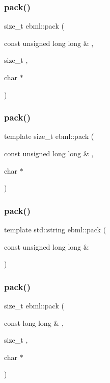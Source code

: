 \subsubsection{\texorpdfstring{pack()}{pack()}\hspace{0.1cm}{\footnotesize\ttfamily [2/18]}}
{\footnotesize\ttfamily size\+\_\+t ebml\+::pack (\begin{DoxyParamCaption}\item[{const unsigned long long \&}]{,  }\item[{size\+\_\+t}]{,  }\item[{char $\ast$}]{ }\end{DoxyParamCaption})}

\mbox{\label{namespaceebml_aefd18e43ba3909d196ab0bfa6d4ab640}} 
\subsubsection{\texorpdfstring{pack()}{pack()}\hspace{0.1cm}{\footnotesize\ttfamily [3/18]}}
{\footnotesize\ttfamily template size\+\_\+t ebml\+::pack (\begin{DoxyParamCaption}\item[{const unsigned long long \&}]{,  }\item[{char $\ast$}]{ }\end{DoxyParamCaption})}

\mbox{\label{namespaceebml_a4792d18415e00b078131b9590e832b9b}} 
\subsubsection{\texorpdfstring{pack()}{pack()}\hspace{0.1cm}{\footnotesize\ttfamily [4/18]}}
{\footnotesize\ttfamily template std\+::string ebml\+::pack (\begin{DoxyParamCaption}\item[{const unsigned long long \&}]{ }\end{DoxyParamCaption})}

\mbox{\label{namespaceebml_ae32979c8cc295384d62cd00e9a256059}} 
\subsubsection{\texorpdfstring{pack()}{pack()}\hspace{0.1cm}{\footnotesize\ttfamily [5/18]}}
{\footnotesize\ttfamily size\+\_\+t ebml\+::pack (\begin{DoxyParamCaption}\item[{const long long \&}]{,  }\item[{size\+\_\+t}]{,  }\item[{char $\ast$}]{ }\end{DoxyParamCaption})}

